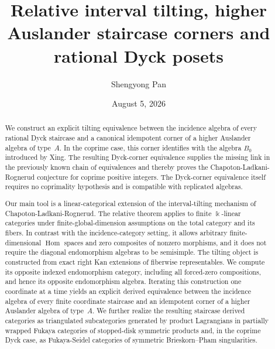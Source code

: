 \documentclass[12pt,a4paper,english,reqno]{amsart}
\title[Relative interval tilting and Dyck posets]
{Relative interval tilting, higher Auslander staircase corners and rational Dyck posets}
\author{Shengyong Pan}
\date{August 5, 2026}
\theoremstyle{plain}
\theoremstyle{definition}
\newcommand{\kk}{\Bbbk}
\newcommand{\Hom}{\operatorname{Hom}}
\begin{document}
\begin{abstract}
We construct an explicit tilting equivalence between the incidence algebra of
every rational Dyck staircase and a canonical idempotent corner of a higher
Auslander algebra of type~$A$. In the coprime case, this corner identifies
with the algebra $B_0$ introduced by Xing. The resulting Dyck-corner
equivalence supplies the missing link in the previously known chain of
equivalences and thereby proves the Chapoton-Ladkani-Rognerud conjecture
for coprime positive integers. The Dyck-corner equivalence itself requires
no coprimality hypothesis and is compatible with replicated algebras.

Our main tool is a linear-categorical extension of the interval-tilting
mechanism of Chapoton-Ladkani-Rognerud. The relative theorem applies to
finite $\kk$-linear categories under finite-global-dimension assumptions on
the total category and its fibers. In contrast with the incidence-category
setting, it allows arbitrary finite-dimensional $\Hom$ spaces and zero
composites of nonzero morphisms, and it does not require the diagonal
endomorphism algebras to be semisimple. The tilting object is constructed
from exact right Kan extensions of fiberwise representables. We compute its
opposite indexed endomorphism category, including all forced-zero
compositions, and hence its opposite endomorphism algebra. Iterating this
construction one coordinate at a time yields an explicit derived
equivalence between the incidence algebra of every finite coordinate
staircase and an idempotent corner of a higher Auslander algebra of type~$A$.
We further realize the resulting staircase derived categories as
triangulated subcategories generated by product Lagrangians in partially
wrapped Fukaya categories of stopped-disk symmetric products and, in the
coprime Dyck case, as Fukaya-Seidel categories of symmetric
Brieskorn--Pham singularities.

\end{abstract}

\address{School of Mathematics and Statistics, Beijing Jiaotong University,
Beijing, 100044, China.}
\address{Beijing Key Laboratory of Biological Big Data and Topological Statistics, Beijing Jiaotong University,
Beijing, 100044, China.}
\maketitle
\end{document}

